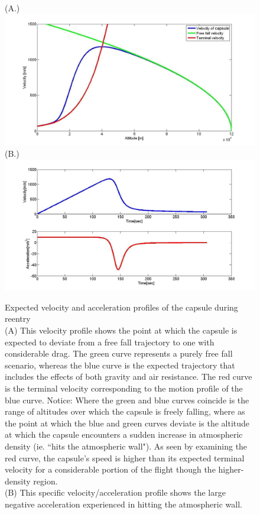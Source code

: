 \documentclass{article}
\begin{document}
\newpage
	\begin{figure}[H]
	\begin{center}
		(A.)
		\includegraphics[width=14cm]{BallDrop_120km}\\
		\vspace{1cm}
		(B.)
		\includegraphics[width=14cm]{KinematicsBallDrop_120km}\\
	\end{center}
		\caption{}
		\label{accel}
Expected velocity and acceleration profiles of the capsule during reentry\\ (A) This velocity profile shows the point at which the capsule is expected to deviate from a free fall trajectory to one with considerable drag. The green curve represents a purely free fall scenario, whereas the blue curve is the expected trajectory that includes the effects of both gravity and air resistance. The red curve is the terminal velocity corresponding to the motion profile of the blue curve. Notice: Where the green and blue curves coincide is the range of altitudes over which the capsule is freely falling, where as the point at which the blue and green curves deviate is the altitude at which the capsule encounters a sudden increase in atmospheric density (ie. ``hits the atmospheric wall"). As seen by examining the red curve, the capsule's speed is higher than its expected terminal velocity for a considerable portion of the flight though the higher-density region.\\ (B) This specific velocity/acceleration profile shows the large negative acceleration experienced in hitting the atmospheric wall.
	\end{figure}
\end{document}
